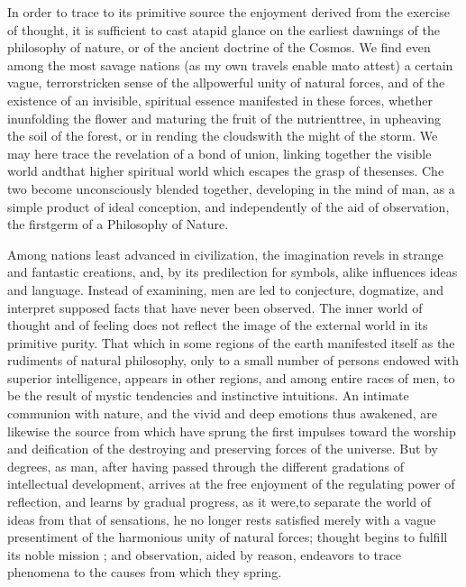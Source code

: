 In order to trace to its primitive source the enjoyment derived from the exercise of thought, it is sufficient to cast atapid glance on the earliest dawnings of the philosophy of nature, or of the ancient doctrine of the Cosmos. We find even among the most savage nations (as my own travels enable mato attest) a certain vague, terrorstricken sense of the allpowerful unity of natural forces, and of the existence of an invisible, spiritual essence manifested in these forces, whether inunfolding the flower and maturing the fruit of the nutrienttree, in upheaving the soil of the forest, or in rending the cloudswith the might of the storm. We may here trace the revelation of a bond of union, linking together the visible world andthat higher spiritual world which escapes the grasp of thesenses. Che two become unconsciously blended together, developing in the mind of man, as a simple product of ideal conception, and independently of the aid of observation, the firstgerm of a Philosophy of Nature.

Among nations least advanced in civilization, the imagination revels in strange and fantastic creations, and, by its predilection for symbols, alike influences ideas and language. Instead of examining, men are led to conjecture, dogmatize, and interpret supposed facts that have never been observed. The inner world of thought and of feeling does not reflect the image of the external world in its primitive purity. That which in some regions of the earth manifested itself as the rudiments of natural philosophy, only to a small number of persons endowed with superior intelligence, appears in other regions, and among entire races of men, to be the result of mystic tendencies and instinctive intuitions. An intimate communion with nature, and the vivid and deep emotions thus awakened, are likewise the source from which have sprung the first impulses toward the worship and deification of the destroying and preserving forces of the universe. But by degrees, as man, after having passed through the different gradations of intellectual development, arrives at the free enjoyment of the regulating power of reflection, and learns by gradual progress, as it were,to separate the world of ideas from that of sensations, he no longer rests satisfied merely with a vague presentiment of the harmonious unity of natural forces; thought begins to fulfill its noble mission ; and observation, aided by reason, endeavors to trace phenomena to the causes from which they spring.

